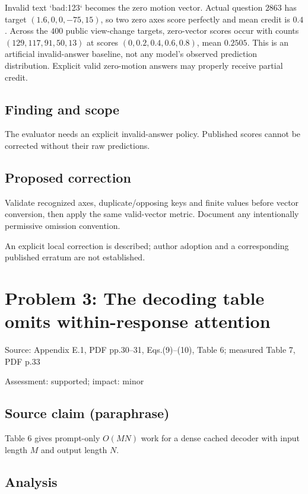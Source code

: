 \documentclass[11pt]{article}
\begin{document}
Invalid text `bad:123` becomes the zero motion vector. Actual question \(2863\) has target \((1.6,0,0,-75,15)\), so two zero axes score perfectly and mean credit is \(0.4\). Across the \(400\) public view-change targets, zero-vector scores occur with counts \((129,117,91,50,13)\) at scores \((0,0.2,0.4,0.6,0.8)\), mean \(0.2505\). This is an artificial invalid-answer baseline, not any model’s observed prediction distribution. Explicit valid zero-motion answers may properly receive partial credit.

\subsection*{Finding and scope}

The evaluator needs an explicit invalid-answer policy. Published scores cannot be corrected without their raw predictions.

\subsection*{Proposed correction}

Validate recognized axes, duplicate/opposing keys and finite values before vector conversion, then apply the same valid-vector metric. Document any intentionally permissive omission convention.

An explicit local correction is described; author adoption and a corresponding published erratum are not established.

\section*{Problem 3: The decoding table omits within-response attention}

Source: Appendix E.1, PDF pp.30–31, Eqs.(9)–(10), Table 6; measured Table 7, PDF p.33

Assessment: supported; impact: minor

\subsection*{Source claim (paraphrase)}

Table 6 gives prompt-only \(O(MN)\) work for a dense cached decoder with input length \(M\) and output length \(N\).

\subsection*{Analysis}
\end{document}

